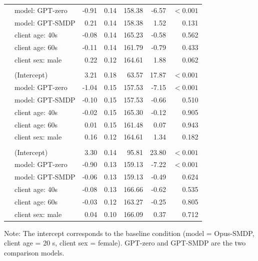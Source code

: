 \documentclass{wiley-article}
\begin{document}
\begin{table}[H]
\begin{threeparttable}
\begin{tabular}{llrrrrr}
        & model: GPT-zero                   & -0.91 & 0.14 & 158.38 &  -6.57 & $<\!0.001$ \\
        & model: GPT-SMDP                  &  0.21 & 0.14 & 158.38 &   1.52 & 0.131 \\
        & client age: 40s                  & -0.08 & 0.14 & 165.23 &  -0.58 & 0.562 \\
        & client age: 60s                  & -0.11 & 0.14 & 161.79 &  -0.79 & 0.433 \\
        & client sex: male                 &  0.22 & 0.12 & 164.61 &   1.88 & 0.062 \\
      \addlinespace
      \multicolumn{7}{l}{\textbf{EMP}}\\
        & (Intercept)                       &  3.21 & 0.18 &  63.57 &  17.87 & $<\!0.001$ \\
        & model: GPT-zero                   & -1.04 & 0.15 & 157.53 &  -7.15 & $<\!0.001$ \\
        & model: GPT-SMDP                  & -0.10 & 0.15 & 157.53 &  -0.66 & 0.510 \\
        & client age: 40s                  & -0.02 & 0.15 & 165.30 &  -0.12 & 0.905 \\
        & client age: 60s                  &  0.01 & 0.15 & 161.48 &   0.07 & 0.943 \\
        & client sex: male                 &  0.16 & 0.12 & 164.61 &   1.34 & 0.182 \\
      \addlinespace
      \multicolumn{7}{l}{\textbf{OVR}}\\
        & (Intercept)                       &  3.30 & 0.14 &  95.81 &  23.80 & $<\!0.001$ \\
        & model: GPT-zero                   & -0.90 & 0.13 & 159.13 &  -7.22 & $<\!0.001$ \\
        & model: GPT-SMDP                  & -0.06 & 0.13 & 159.13 &  -0.49 & 0.624 \\
        & client age: 40s                  & -0.08 & 0.13 & 166.66 &  -0.62 & 0.535 \\
        & client age: 60s                  & -0.03 & 0.12 & 163.27 &  -0.25 & 0.805 \\
        & client sex: male                 &  0.04 & 0.10 & 166.09 &   0.37 & 0.712 \\
      \bottomrule
    \end{tabular}
    \begin{tablenotes}
      \scriptsize
      \item Note: The intercept corresponds to the baseline condition (model = Opus-SMDP, client age = 20 s, client sex = female). GPT-zero and GPT-SMDP are the two comparison models.
    \end{tablenotes}
  \end{threeparttable}
\end{table}
\end{document}
